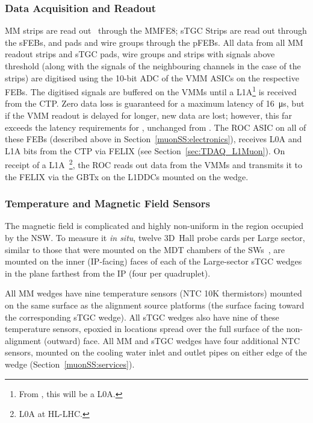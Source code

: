 \documentclass[cernpreprint, atlasdraft=false, UKenglish,british,orcidlogo, texmf, orcidlogo]{atlasdoc}
\begin{document}
\subsubsection{Data Acquisition and Readout \label{muonSS:readout}} 
\gls{MM} strips are read out~\cite{NSWelx} 
through the \gls{MMFE8}; \gls{sTGC} Strips are read out through the \glspl{sFEB}, and pads and wire groups through the \glspl{pFEB}.
All data from all \gls{MM} readout strips and \gls{sTGC} pads, wire groups and strips with signals above threshold (along with the signals of the neighbouring channels in the case of the strips) are digitised using the 10-bit \gls{ADC} of the \gls{VMM} \glspl{ASIC} on the respective \glspl{FEB}.
The digitised signals are buffered on the \glspl{VMM} until a \gls{L1A}\footnote{From \RunFour, this will be a \gls{L0A}.} is received from the \gls{CTP}.
Zero data loss is guaranteed for a maximum latency of \SI{16}{\us}, but if the \gls{VMM} readout is delayed for longer, new data are lost; however, this far exceeds the latency requirements for \RunThr, unchanged from \RunOneTwo.
The \gls{ROC} \gls{ASIC} on all of these \glspl{FEB} (described above in Section~\ref{muonSS:electronics}), receives \gls{L0A} and \gls{L1A} bits from the \gls{CTP} via \gls{FELIX} (see Section~\ref{sec:TDAQ_L1Muon}).
On receipt of a \gls{L1A}~\footnote{\gls{L0A} at \gls{HL-LHC}.}, the \gls{ROC} reads out data from the \glspl{VMM} and transmits it to the \gls{FELIX} via the \gls{GBTx} on the \glspl{L1DDC} mounted on the wedge.
 
 
\subsubsection{Temperature and Magnetic Field Sensors \label{sss:TandBsensors}} 
The magnetic field is complicated and highly non-uniform in the region occupied by the \gls{NSW}.
To measure it {\em in situ}, twelve 3D~Hall probe cards per Large sector, similar to those that were mounted on the \gls{MDT} chambers of the \glspl{SW}~\cite{PERF-2007-01}, are mounted on the inner (\gls{IP}-facing) faces of each of the Large-sector \gls{sTGC} wedges in the plane farthest from the \gls{IP} (four per quadruplet).
 
All \gls{MM} wedges have nine temperature sensors (\gls{NTC} 10K thermistors) mounted on the same surface as the alignment source platforms (the surface facing toward the corresponding \gls{sTGC} wedge).
All \gls{sTGC} wedges also have nine of these temperature sensors, epoxied
in locations spread over the full surface of the non-alignment (outward) face.
All \gls{MM} and \gls{sTGC} wedges have four additional \gls{NTC} sensors, mounted on the cooling water inlet and outlet pipes on either edge of the wedge (Section~\ref{muonSS:services}).
 
\end{document}
